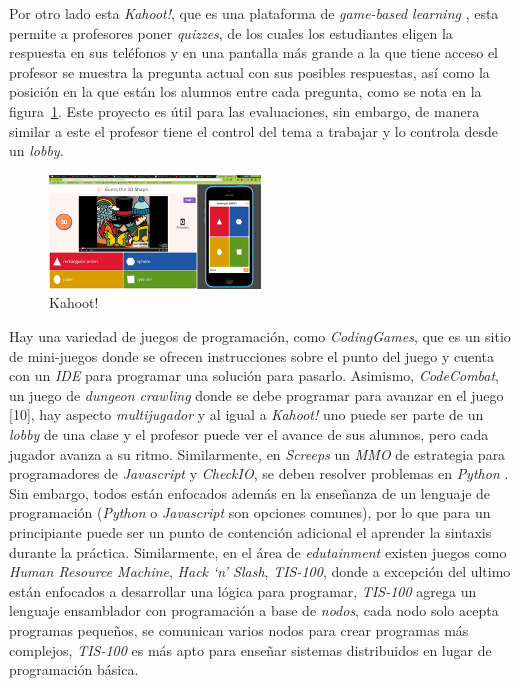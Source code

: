 Por otro lado esta \textit{Kahoot!}, que es una plataforma de \textit{game-based learning} \cite{wang2015a}, esta permite a profesores poner \textit{quizzes}, de los cuales los estudiantes eligen la respuesta en sus teléfonos y en una pantalla más grande a la que tiene acceso el profesor se muestra la pregunta actual con sus posibles respuestas, así como la posición en la que están los alumnos entre cada pregunta, como se nota en la figura~\ref{fig:kahoot}. Este proyecto es útil para las evaluaciones, sin embargo, de manera similar a este el profesor tiene el control del tema a trabajar y lo controla desde un \textit{lobby}. 

\begin{figure}[ht]
    \centering
    \includegraphics[width=0.5\textwidth]{images/kahoot.png}
    \caption{Kahoot!}
    \label{fig:kahoot}
\end{figure}

Hay una variedad de juegos de programación, como \textit{CodingGames}, que es un sitio de mini-juegos donde se ofrecen instrucciones sobre el punto del juego y cuenta con un \textit{IDE} para programar una solución para pasarlo. Asimismo, \textit{CodeCombat}, un juego de \textit{dungeon crawling} donde se debe programar para avanzar en el juego [10], hay aspecto \textit{multijugador} y al igual a \textit{Kahoot!} uno puede ser parte de un \textit{lobby} de una clase y el profesor puede ver el avance de sus alumnos, pero cada jugador avanza a su ritmo. Similarmente, en \textit{Screeps} un \textit{MMO} de estrategia para programadores de \textit{Javascript} y \textit{CheckIO}, se deben resolver problemas en \textit{Python} \cite{programming_games}. Sin embargo, todos están enfocados además en la enseñanza de un lenguaje de programación (\textit{Python} o \textit{Javascript} son opciones comunes), por lo que para un principiante puede ser un punto de contención adicional el aprender la sintaxis durante la práctica. Similarmente, en el área de \textit{edutainment} existen juegos como \textit{Human Resource Machine}, \textit{Hack ‘n’ Slash}, \textit{TIS-100}, donde a excepción del ultimo están enfocados a desarrollar una lógica para programar, \textit{TIS-100} agrega un lenguaje ensamblador con programación a base de \textit{nodos}, cada nodo solo acepta programas pequeños, se comunican varios nodos para crear programas más complejos, \textit{TIS-100} es más apto para enseñar sistemas distribuidos en lugar de programación básica.

